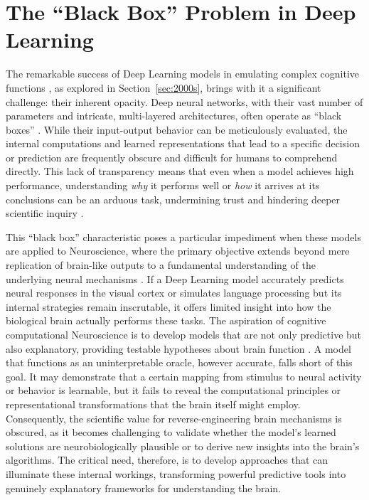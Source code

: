 \documentclass[11pt,a4paper]{article}
\begin{document}
\section{The ``Black Box'' Problem in Deep Learning}

The remarkable success of Deep Learning models in emulating complex cognitive functions \cite{lecun2015deep}, as explored in Section~\ref{sec:2000s}, brings with it a significant challenge: their inherent opacity. Deep neural networks, with their vast number of parameters and intricate, multi-layered architectures, often operate as ``black boxes'' \cite{doshi2017towards}. While their input-output behavior can be meticulously evaluated, the internal computations and learned representations that lead to a specific decision or prediction are frequently obscure and difficult for humans to comprehend directly. This lack of transparency means that even when a model achieves high performance, understanding \textit{why} it performs well or \textit{how} it arrives at its conclusions can be an arduous task, undermining trust and hindering deeper scientific inquiry \cite{ribeiro2016why, miller2019explanation}.

This ``black box'' characteristic poses a particular impediment when these models are applied to Neuroscience, where the primary objective extends beyond mere replication of brain-like outputs to a fundamental understanding of the underlying neural mechanisms \cite{richards2019deep, savage2019how}. If a Deep Learning model accurately predicts neural responses in the visual cortex \cite{yamins2016using} or simulates language processing \cite{caucheteux2022brains} but its internal strategies remain inscrutable, it offers limited insight into how the biological brain actually performs these tasks. The aspiration of cognitive computational Neuroscience is to develop models that are not only predictive but also explanatory, providing testable hypotheses about brain function \cite{kriegeskorte2018cognitive}. A model that functions as an uninterpretable oracle, however accurate, falls short of this goal. It may demonstrate that a certain mapping from stimulus to neural activity or behavior is learnable, but it fails to reveal the computational principles or representational transformations that the brain itself might employ. Consequently, the scientific value for reverse-engineering brain mechanisms is obscured, as it becomes challenging to validate whether the model's learned solutions are neurobiologically plausible or to derive new insights into the brain's algorithms. The critical need, therefore, is to develop approaches that can illuminate these internal workings, transforming powerful predictive tools into genuinely explanatory frameworks for understanding the brain.
\end{document}

